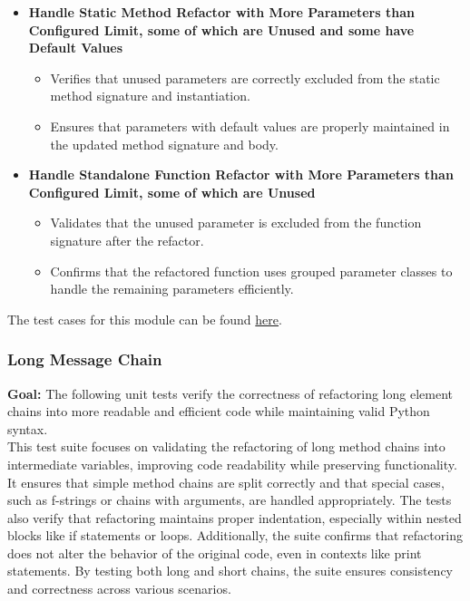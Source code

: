\documentclass[12pt, titlepage]{article}
\begin{document}
\begin{itemize}
    \item \textbf{Handle Static Method Refactor with More Parameters than Configured Limit, some of which are Unused and some have Default Values}
    \begin{itemize}
        \item Verifies that unused parameters are correctly excluded from the static method signature and instantiation.
        \item Ensures that parameters with default values are properly maintained in the updated method signature and body.
    \end{itemize}

    \item \textbf{Handle Standalone Function Refactor with More Parameters than Configured Limit, some of which are Unused}
    \begin{itemize}
        \item Validates that the unused parameter is excluded from the function signature after the refactor.
        \item Confirms that the refactored function uses grouped parameter classes to handle the remaining parameters efficiently.
    \end{itemize}
\end{itemize}

\noindent The test cases for this module can be found \href{https://github.com/ssm-lab/capstone--source-code-optimizer/blob/new-poc/tests/refactorers/test_long_parameter_list_refactor.py
}{here}.

\subsubsection{Long Message Chain}

\textbf{Goal:} The following unit tests verify the correctness of refactoring long element chains into more readable and efficient code while maintaining valid Python syntax.\\

\noindent This test suite focuses on validating the refactoring of long method chains into 
intermediate variables, improving code readability while preserving functionality. 
It ensures that simple method chains are split correctly and that special cases, 
such as f-strings or chains with arguments, are handled appropriately. The tests 
also verify that refactoring maintains proper indentation, especially within nested 
blocks like if statements or loops. Additionally, the suite confirms that 
refactoring does not alter the behavior of the original code, even in contexts 
like print statements. By testing both long and short chains, the suite ensures 
consistency and correctness across various scenarios.\\
\end{document}
